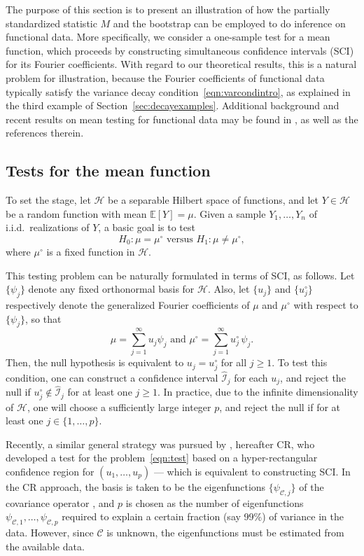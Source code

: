 \documentclass[aos,preprint]{imsart}
\numberwithin{equation}{section}
\theoremstyle{plain}
\renewcommand{\hat}[1]{\widehat{#1}}
\newcommand{\E}{\mathbb{E}}
\newcommand{\tsum}{\textstyle\sum}
\newcommand{\1}{{\bf{1}}}
\newcommand{\0}{\mathbf{0}}
\newcommand{\hilbert}{\mathcal{H}}
\newcommand{\sci}{\hat{\mathcal{I}}}
\def\ci{\cite}
\begin{document}
The purpose of this section is to present an illustration of how the partially standardized statistic $M$ and the bootstrap can be employed to do inference on functional
data.
%
More specifically, we consider a one-sample test for a mean function, which proceeds by constructing simultaneous confidence intervals (SCI) for its Fourier coefficients. With regard to our theoretical results, this is a natural problem for illustration, because the Fourier coefficients of functional data typically satisfy the variance decay condition~\eqref{eqn:varcondintro}, as explained in the third example of Section~\ref{sec:decayexamples}. Additional background and recent results on mean testing for functional data may be found in \ci{Benko:2009,degras2011simultaneous,Cao:2012,horvath2013,zhen:14,Choi2018,zhan:18}, as well as the references therein.
%

\subsection{Tests for the mean function}
To set the stage, let $\hilbert$ be a separable Hilbert space of functions, and
let $Y\in \hilbert$ be a random function with mean $\E[Y]=\mu$.
Given a sample $Y_{1},\ldots,Y_{n}$ of i.i.d.~realizations of $Y$,
a basic goal  is to test 
\begin{equation}\label{eqn:test}
H_0: \mu=\mu^{\circ} \text{ \ \ \ \ \ versus \ \ \ \ \ } H_1: \mu\neq \mu^{\circ},
\end{equation}
where $\mu^{\circ}$ is a fixed function in $\hilbert$. 

This testing problem can be naturally formulated in terms of  SCI, as follows.
Let $\{\psi_j\}$ denote any fixed orthonormal basis for $\hilbert$. Also, let $\{u_j\}$ and $\{u_{j}^{\circ}\}$ respectively denote the generalized Fourier coefficients of $\mu$ and $\mu^{\circ}$ with respect to $\{\psi_j\}$, so that
$$\mu=\tsum_{j=1}^{\infty}u_{j}\psi_{j} \text{\  \ \ \ \ and \ \ \ \ \ } \mu^{\circ}=\tsum_{j=1}^{\infty}u_{j}^{\circ}\,\psi_{j}.$$
 Then, the null hypothesis is equivalent to
$u_{j}=u_{j}^{\circ}$ for all $j\geq 1$.
 To test this condition, one can construct a confidence interval $\sci_{j}$ for each $u_{j}$, and reject the null if $u_{j}^{\circ}\not\in \sci_{j}$ for at least one $j\geq 1$. In practice, due to the 
infinite dimensionality of  $\hilbert$, one will choose a sufficiently large integer
$p$, and reject the null if \smash{$u_{j}^{\circ}\not\in \sci_{j}$} for at least one $j\in\{1,\dots,p\}$.

Recently, a similar  general strategy was pursued by  \cite{Choi2018}, hereafter CR, who developed a test for the problem~\eqref{eqn:test} based on a hyper-rectangular confidence region for $(u_1,\dots,u_p)$  --- which is equivalent to constructing SCI.  In the CR approach, the basis is taken to be the eigenfunctions $\{\psi_{\mathcal{C},j}\}$ of the covariance operator , and $p$  
is chosen as the number of eigenfunctions $\psi_{\mathcal{C},1},\dots,\psi_{\mathcal{C},p}$ required to explain a certain fraction (say 99\%)  of variance in the data. However, since $\mathcal{C}$ is unknown, the eigenfunctions must be estimated from the available data. 
\end{document}
